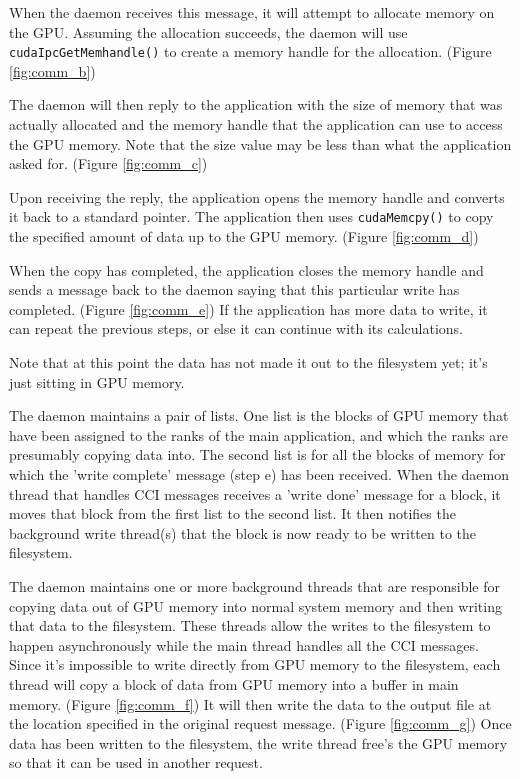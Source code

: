 When the daemon receives this message, it will attempt to allocate memory on the GPU.  Assuming the allocation succeeds, the daemon will use \texttt{cudaIpcGetMemhandle()} to create a memory handle for the allocation. (Figure \ref{fig:comm_b})

The daemon will then reply to the application with the size of memory that was actually allocated and the memory handle that the application can use to access the GPU memory.  Note that the size value may be less than what the application asked for. (Figure \ref{fig:comm_c})

Upon receiving the reply, the application opens the memory handle and converts it back to a standard pointer.  The application then uses \texttt{cudaMemcpy()} to copy the specified amount of data up to the GPU memory. (Figure \ref{fig:comm_d}) 

When the copy has completed, the application closes the memory handle and sends a message back to the daemon saying that this particular write has completed.  (Figure \ref{fig:comm_e})  If the application has more data to write, it can repeat the previous steps, or else it can continue with its calculations.

Note that at this point the data has not made it out to the filesystem yet; it's just sitting in GPU memory.  

The daemon maintains a pair of lists.  One list is the blocks of GPU memory that have been assigned to the ranks of the main application, and which the ranks are presumably copying data into.  The second list is for all the blocks of memory for which the 'write complete' message (step e) has been received.  When the daemon thread that handles CCI messages receives a 'write done' message for a block, it moves that block from the first list to the second list.  It then notifies the background write thread(s) that the block is now ready to be written to the filesystem.

The daemon maintains one or more background threads that are responsible for copying data out of GPU memory into normal system memory and then writing that data to the filesystem.  These threads allow the writes to the filesystem to happen asynchronously while the main thread handles all the CCI messages.  Since it's impossible to write directly from GPU memory to the filesystem, each thread will copy a block of data from GPU memory into a buffer in main memory.  (Figure \ref{fig:comm_f})  It will then write the data to the output file at the location specified in the original request message.  (Figure \ref{fig:comm_g})  Once data has been written to the filesystem, the write thread free's the GPU memory so that it can be used in another request.


